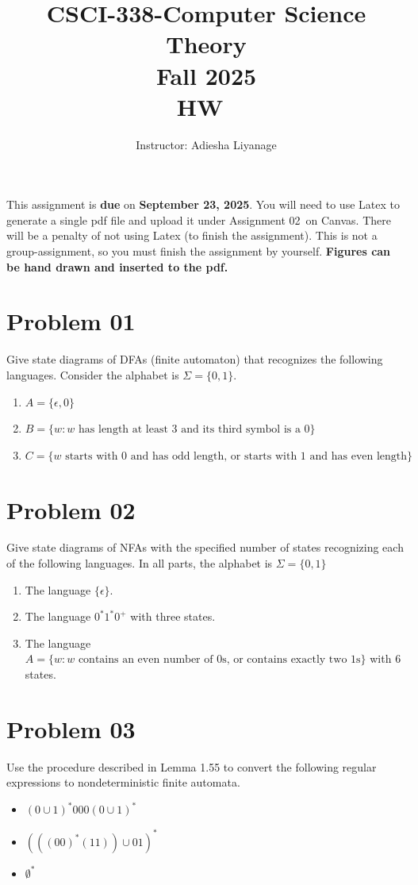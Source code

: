 \documentclass{article}
\title{CSCI-338-Computer Science Theory\\Fall 2025 \\HW~\assignmentnumber}
\author{Instructor: Adiesha Liyanage }
\date{}
\newcommand{\assignmentnumber}{02~}
\newcommand{\assignmentduedate}{September 23, 2025}
\begin{document}
\maketitle
This assignment is \textbf{due} on \textbf{\assignmentduedate}. You will need to use Latex to generate a single pdf file and upload it under Assignment \assignmentnumber on Canvas. There will be a penalty of not using Latex (to finish the assignment). This is not a group-assignment, so you must finish the assignment by yourself. \textbf{Figures can be hand drawn and inserted to the pdf.}

\section{Problem 01}
\noindent
Give state diagrams of DFAs (finite automaton) that recognizes the following languages. Consider the alphabet is \(\Sigma = \{0,1\}\).
\begin{enumerate}
    \item \(A = \{ \epsilon, 0\}\)
    \item \(B = \{ w : w \text{ has length at least 3 and its third symbol is a 0}\}\)
    \item \(C = \{ w \text{ starts with 0 and has odd length, or starts with 1 and has even length}\}\)
\end{enumerate}


\section{Problem 02}
Give state diagrams of NFAs with the specified number of states recognizing each of the following languages. In all parts, the alphabet is 
 \(\Sigma = \{0,1\}\) 
 \begin{enumerate}
     \item The language \(\{\epsilon\}\).
     \item The language \(0^*1^*0^+\) with three states.
     \item The language \(A = \{w : w \text{ contains an even number of 0s, or contains exactly two 1s}\}\) with $6$ states.
 \end{enumerate}

\section{Problem 03}
Use the procedure described in Lemma 1.55 to convert the following regular expressions to nondeterministic finite automata.
\begin{itemize}
    \item \((0 \cup 1)^*000(0 \cup 1)^*\)
    \item \((((00)^*(11)) \cup 01)^*\)
    \item \(\emptyset^*\)
\end{itemize}
\end{document}
